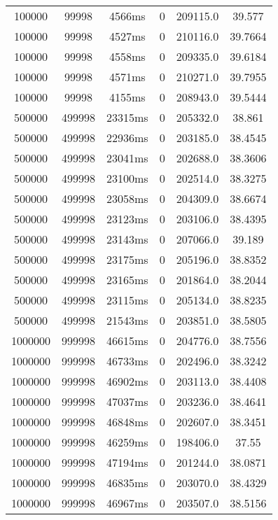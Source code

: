 \documentclass[./main.tex]{subfiles}
\begin{document}
\begin{table}
\begin{tabular}{ c | c | c | c | c | c }
        100000 & 99998 & 4566ms & 0 & 209115.0 & 39.577 \\
        100000 & 99998 & 4527ms & 0 & 210116.0 & 39.7664 \\
        100000 & 99998 & 4558ms & 0 & 209335.0 & 39.6184 \\
        100000 & 99998 & 4571ms & 0 & 210271.0 & 39.7955 \\
        100000 & 99998 & 4155ms & 0 & 208943.0 & 39.5444 \\
        \hline
        500000 & 499998 & 23315ms & 0 & 205332.0 & 38.861 \\
        500000 & 499998 & 22936ms & 0 & 203185.0 & 38.4545 \\
        500000 & 499998 & 23041ms & 0 & 202688.0 & 38.3606 \\
        500000 & 499998 & 23100ms & 0 & 202514.0 & 38.3275 \\
        500000 & 499998 & 23058ms & 0 & 204309.0 & 38.6674 \\
        500000 & 499998 & 23123ms & 0 & 203106.0 & 38.4395 \\
        500000 & 499998 & 23143ms & 0 & 207066.0 & 39.189 \\
        500000 & 499998 & 23175ms & 0 & 205196.0 & 38.8352 \\
        500000 & 499998 & 23165ms & 0 & 201864.0 & 38.2044 \\
        500000 & 499998 & 23115ms & 0 & 205134.0 & 38.8235 \\
        \rowcolor{lightgray} 500000 & 499998 & 21543ms & 0 & 203851.0 & 38.5805 \\
        \hline
        1000000 & 999998 & 46615ms & 0 & 204776.0 & 38.7556 \\
        1000000 & 999998 & 46733ms & 0 & 202496.0 & 38.3242 \\
        1000000 & 999998 & 46902ms & 0 & 203113.0 & 38.4408 \\
        1000000 & 999998 & 47037ms & 0 & 203236.0 & 38.4641 \\
        1000000 & 999998 & 46848ms & 0 & 202607.0 & 38.3451 \\
        1000000 & 999998 & 46259ms & 0 & 198406.0 & 37.55 \\
        1000000 & 999998 & 47194ms & 0 & 201244.0 & 38.0871 \\
        \rowcolor{lightgray} 1000000 & 999998 & 46835ms & 0 & 203070.0 & 38.4329 \\
        1000000 & 999998 & 46967ms & 0 & 203507.0 & 38.5156 \\

\end{tabular}
\end{table}
\end{document}
